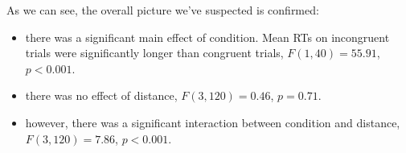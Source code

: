 \documentclass[11pt]{article}
\begin{document}
As we can see, the overall picture we've suspected is confirmed:

\begin{itemize}
\item there was a significant main effect of condition.  Mean RTs on incongruent trials were significantly longer than congruent trials, $F(1,40)=55.91$, $p<0.001$.
\item there was no effect of distance, $F(3,120)=0.46$, $p=0.71$.
\item however, there was a significant interaction between condition and distance, $F(3,120)=7.86$, $p<0.001$.
\end{itemize}
\end{document}
